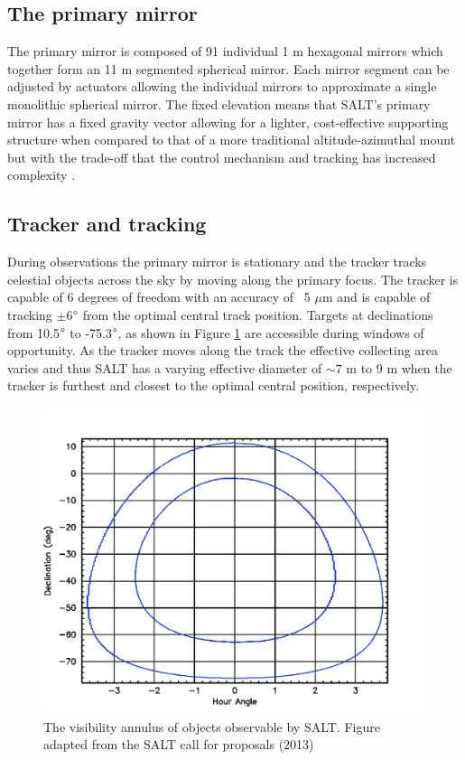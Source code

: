 \subsection{The primary mirror}

The primary mirror is composed of 91 individual 1 m hexagonal mirrors which together form an 11 m segmented spherical mirror. Each mirror segment can be adjusted by actuators allowing the individual mirrors to approximate a single monolithic spherical mirror. The fixed elevation means that SALT's primary mirror has a fixed gravity vector allowing for a lighter, cost-effective supporting structure when compared to that of a more traditional altitude-azimuthal mount but with the trade-off that the control mechanism and tracking has increased complexity \citep{SALT_design}.

\subsection{Tracker and tracking}

During observations the primary mirror is stationary and the tracker tracks celestial objects across the sky by moving along the primary focus. The tracker is capable of 6 degrees of freedom with an accuracy of ~5 $\mu$m and is capable of tracking $\pm$6$\degree$ from the optimal central track position. Targets at declinations from 10.5$\degree$ to -75.3$\degree$, as shown in Figure \ref{fig:SALT_visibility} are accessible during windows of opportunity. As the tracker moves along the track the effective collecting area varies and thus SALT has a varying effective diameter of $\sim7$ m to 9 m when the tracker is furthest and closest to the optimal central position, respectively.
\prgph

\begin{figure}[t]
    \centering
    \includegraphics[width = 13cm]{figures/2_SALT_visibility.png}
    \caption{The visibility annulus of objects observable by SALT. Figure adapted from the SALT call for proposals (2013)\protect\footnotemark}
    \label{fig:SALT_visibility}
\end{figure}

